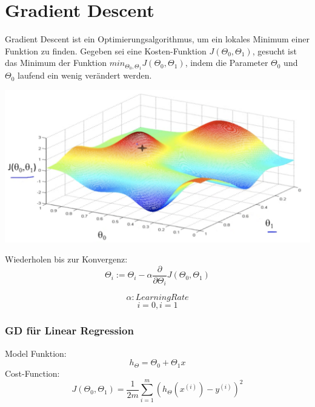 \newpage
\section{Gradient Descent}

\begin{flushleft}

Gradient Descent ist ein Optimierungsalgorithmus, um ein lokales Minimum einer Funktion zu finden.
Gegeben sei eine Kosten-Funktion $J(\Theta_{0}, \Theta_{1})$, gesucht ist das Minimum der Funktion $min_{\Theta_{0}, \Theta_{1}} J(\Theta_{0}, \Theta_{1})$, indem die Parameter $\Theta_{0}$ und $\Theta_{0}$ laufend ein wenig verändert werden.

\includegraphics[scale=0.6]{figures/gradient_descent}

Wiederholen bis zur Konvergenz:
$$\Theta_{i} := \Theta_{i} - \alpha\frac{\partial}{\partial \Theta_{i}} J(\Theta_{0}, \Theta_{1}) $$

$$ \alpha: Learning Rate $$
$$ i=0, i=1 $$

\subsubsection{GD für Linear Regression}
Model Funktion:
$$h_{\Theta} = \Theta_{0} + \Theta_{1}x$$
Cost-Function:
$$ J(\Theta_{0}, \Theta_{1}) = \frac{1}{2m} \sum_{i=1}^{m}(h_{\Theta}(x^{(i)})-y^{(i)})^{2} $$


\end{flushleft}
